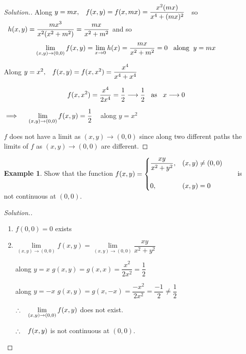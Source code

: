\documentclass[11pt,a4paper]{article}
\theoremstyle{definition}
\newtheorem{exa}[thm]{Example}
\newenvironment{solution}
  {\renewcommand{\qedsymbol}{}\begin{proof}[\textit{Solution}.]}
  {\end{proof}}
\begin{document}
\begin{solution}


Along $y = mx, \hspace{0.3cm} f(x,y) = f(x,mx) = \dfrac{x^2 (mx)}{x^4 + (mx)^2}\hspace{0.2cm}$ so $\hspace{0.2cm} h(x,y) = \dfrac{mx^3}{x^2(x^2 + m^2)} = \dfrac{mx}{x^2 + m^2}$ and so $$\lim\limits_{(x,y) \rightarrow (0,0)}f(x,y) = \lim\limits_{x \rightarrow 0} h(x) = \dfrac{mx}{x^2 + m^2} = 0 \hspace{0.3cm}\text{along}\hspace{0.2cm} y = mx$$


Along $y = x^2, \hspace{0.3cm} f(x,y) = f(x,x^2) = \dfrac{x^4}{x^4 + x^4}$


$$f(x,x^2) = \dfrac{x^4}{2x^4} = \dfrac{1}{2}\longrightarrow \dfrac{1}{2} \hspace{0.3cm} \text{as}\hspace{0.3cm} x \longrightarrow 0$$


$\implies\hspace{0.4cm}\lim\limits_{(x,y) \rightarrow (0,0)}f(x,y) = \dfrac{1}{2}\hspace{0.3cm}$ along $y = x^2$


$f$ does not have a limit as $(x,y) \longrightarrow (0,0)$ since along two different paths the limits of $f$ as $(x,y) \longrightarrow (0,0)$ are different.
\end{solution}


\begin{exa}


Show that the function
$ f(x,y) = 
\begin{cases}
\dfrac{xy}{x^2 + y^2} , & (x,y) \neq (0,0)\\\\
0, & (x,y) = 0\\
\end{cases}\hspace{0.6cm}
$ is not continuous at $(0,0)$.
\end{exa}


\begin{solution}
\begin{enumerate}
\item $f(0,0) = 0 $ exists

\item $\lim\limits_{(x,y) \rightarrow (0,0)}f(x,y) = \lim\limits_{(x,y) \rightarrow (0,0)}\dfrac{xy}{x^2 + y^2}$

along $y =x$
$g(x,y) = g(x,x) = \dfrac{x^2}{2x^2} = \dfrac{1}{2}$

along $y  = -x$
$g(x,y) = g(x,-x) = \dfrac{-x^2}{2x^2} = \dfrac{-1}{2}\neq \dfrac{1}{2}$

$\therefore\hspace{0.3cm} \lim\limits_{(x,y) \rightarrow (0,0)}f(x,y)$ does not exist.

$\therefore\hspace{0.3cm} f(x,y)$ is not continuous at $(0,0)$.
\end{enumerate}
\end{solution}
\end{document}

